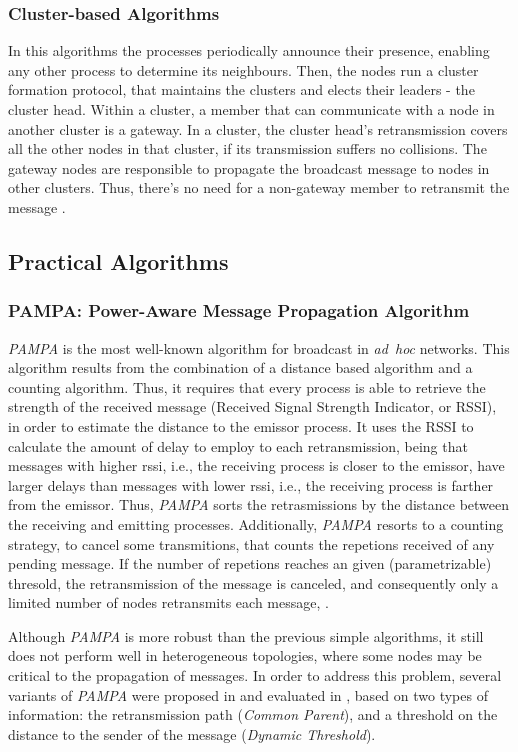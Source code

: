 \documentclass[conference]{IEEEtran}
\begin{document}
\subsubsection{Cluster-based Algorithms}
In this algorithms the processes periodically announce their presence, enabling any other process to determine its neighbours. Then, the nodes run a cluster formation protocol, that maintains the clusters and elects their leaders - the cluster head. Within a cluster, a member that can communicate with a node in another cluster is a gateway. In a cluster, the cluster head’s retransmission covers all the other nodes in that cluster, if its transmission suffers no collisions. The gateway nodes are responsible to propagate the broadcast message to nodes in other clusters. Thus, there's no need for a non-gateway member to retransmit the message \cite{cluster}.

\subsection{Practical Algorithms}

\subsubsection{PAMPA: Power-Aware Message Propagation Algorithm}

\emph{PAMPA} is the most well-known algorithm for broadcast in \emph{ad~hoc} networks. This algorithm results from the combination of a distance based algorithm and a counting algorithm. Thus, it requires that every process is able to retrieve the strength of the received message (Received Signal Strength Indicator, or RSSI), in order to estimate the distance to the emissor process. It uses the RSSI to calculate the amount of delay to employ to each retransmission, being that messages with higher rssi, i.e., the receiving process is closer to the emissor, have larger delays than messages with lower rssi, i.e., the receiving process is farther from the emissor. Thus, \emph{PAMPA} sorts the retrasmissions by the distance between the receiving and emitting processes. Additionally, \emph{PAMPA} resorts to a counting strategy, to cancel some transmitions, that counts the repetions received of any pending message. If the number of repetions reaches an given (parametrizable) thresold, the retransmission of the message is canceled, and consequently only a limited number of nodes retransmits each message, \cite{pampa}.

Although \emph{PAMPA} is more robust than the previous simple algorithms, it still does not perform well in heterogeneous topologies, where some nodes may be critical to the propagation of messages. In order to address this problem, several variants of \emph{PAMPA} were proposed in \cite{counter2bcast} and evaluated in \cite{pampawild}, based on two types of information: the retransmission path (\emph{Common Parent}), and a threshold on the distance to the sender of the message (\emph{Dynamic Threshold}).
\end{document}
